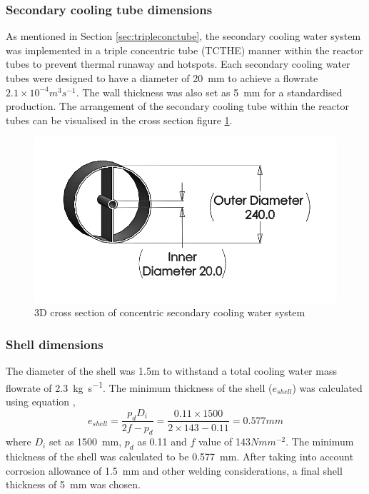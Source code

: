 \subsubsection{Secondary cooling tube dimensions}
As mentioned in Section \ref{sec:tripleconctube}, the secondary cooling water system was implemented in a triple concentric tube (TCTHE) manner within the reactor tubes to prevent thermal runaway and hotspots. Each secondary cooling water tubes were designed to have a diameter of \SI{20}{\milli \metre} to achieve a flowrate $2.1 \times 10^{-4} m^3 s^{-1}$. The wall thickness was also set as \SI{5}{\milli \metre} for a standardised production. 
The arrangement of the secondary cooling tube within the reactor tubes can be visualised in the cross section figure \ref{fig:concentriccoolingwater}. 
\begin{figure}[H]
    \centering
    \includegraphics[width=0.65\linewidth]{chapters/2-reaction/figures/FYD conc tube with calc bw.png} 
    \caption{3D cross section of concentric secondary cooling water system}
    \label{fig:concentriccoolingwater}
\end{figure}

\subsubsection{Shell dimensions}
The diameter of the shell was 1.5m to withstand a total cooling water mass flowrate of \SI{2.3}{\kilogram \per \second}.
The minimum thickness of the shell ($e_{shell}$) was calculated using equation ,
\begin{equation}
    e_{shell} = \frac{p_dD_i}{2f-p_d} = \frac{0.11 \times 1500}{2 \times 143 - 0.11} = 0.577mm
    \label{eqn:minthicknessshell}
\end{equation}
where $D_i$ set as \SI{1500}{\milli \metre}, $p_d$ as 0.11 and $f$ value of 143$Nmm^{-2}$. The minimum thickness of the shell was calculated to be \SI{0.577}{\milli \metre}. After taking into account corrosion allowance of \SI{1.5}{\milli \metre} and other welding considerations, a final shell thickness of \SI{5}{\milli \metre} was chosen. 

